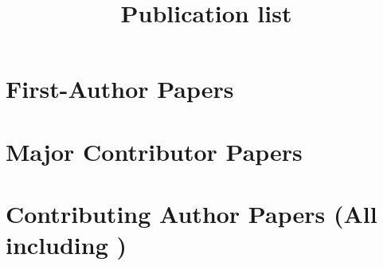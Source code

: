 % 

\title{Publication list}


\noindent



\section*{First-Author Papers}

\begin{etaremune}
    
\end{etaremune}


\section*{Major Contributor Papers}

\begin{etaremune}
    
\end{etaremune}


\section*{Contributing Author Papers {\small (All including \myself)}}

\begin{etaremune}
    
\end{etaremune}






